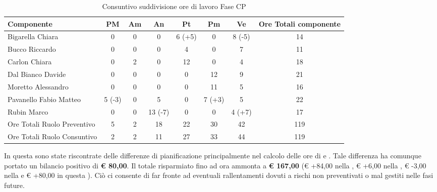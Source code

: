 			\begin{table}[H]
				\begin{center}
					\begin{tabular}{| l | c | c | c | c | c | c | c |}
						\hline
						Componente 					& PM	& Am 	& An 	& Pt 		& Pm 	& Ve 		& Ore Totali componente \\ \hline
						
						Bigarella Chiara 			& 0		& 0		& 0		& 6 (+5)		& 0		& 8 (-5)		& 14 \\
						Bucco Riccardo 				& 0		& 0		& 0		& 4 		& 0		& 7 		& 11 \\
						Carlon Chiara	 			& 0		& 2 	& 0		& 12 		& 0		& 4 		& 18 \\
						Dal Bianco Davide 			& 0		& 0		& 0		& 0			& 12 	& 9 		& 21 \\
						Moretto Alessandro 			& 0		& 0		& 0		& 0			& 11 	& 5			& 16 \\
						Pavanello Fabio Matteo	 	& 5 (-3) & 0	& 5		& 0			& 7 (+3) & 5 		& 22 \\
						Rubin Marco					& 0		& 0		& 13 (-7) & 0		& 0		& 4 (+7)	& 17 \\ \hline \hline
						
						Ore Totali Ruolo Preventivo & 5 	& 2 	& 18 	& 22 		& 30 	& 42 		& 119\\ 
						Ore Totali Ruolo Consuntivo & 2 	& 2 	& 11 	& 27 		& 33 	& 44 		& 119\\ \hline
					\end{tabular}
				\end{center}
				\caption{Consuntivo suddivisione ore di lavoro Fase CP}
			\end{table}

			In questa  sono state riscontrate delle differenze di pianificazione principalmente nel calcolo delle ore di  e . Tale differenza ha comunque portato un bilancio positivo di \textbf{\euro{} 80,00}.
			Il totale risparmiato fino ad ora ammonta a \textbf{\euro{} 167,00} (\euro{} +84,00 nella , \euro{} +6,00 nella , \euro{} -3,00 nella  e \euro{} +80,00 in questa ). Ciò ci consente di far fronte ad eventuali rallentamenti dovuti a rischi non preventivati o mal gestiti nelle fasi future.
	
						
